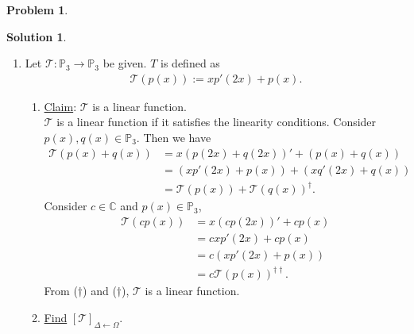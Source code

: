\documentclass{article}
\theoremstyle{definition}
\newtheorem*{prob*}{Problem}
\newtheorem*{sln*}{Solution}
\newcommand{\T}{\mathcal{T}}
\begin{document}
\begin{prob*}
\begin{sln*}
\begin{enumerate}
			
			
			
			\item Let $\T : \mathbb{P}_3 \to \mathbb{P}_3$ be given. $T$ is defined as
			\begin{align*}
			\T(p(x)) := xp'(2x) + p(x).
			\end{align*}
			\begin{enumerate}
				\item \underline{Claim}: $\T$ is a linear function.\\
				$\T$ is a linear function if it satisfies the linearity conditions. Consider $p(x), q(x) \in \mathbb{P}_3$. Then we have
				\begin{align*}
				\T(p(x) + q(x)) &= x(p(2x) + q(2x))' + (p(x) + q(x))\\
				&= (xp'(2x) + p(x))  + (xq'(2x) + q(x))\\ 
				&= \T(p(x)) + \T(q(x))^\dagger.
				\end{align*}
				Consider $c\in \mathbb{C}$ and $p(x)\in \mathbb{P}_3$,
				\begin{align*}
				\T(cp(x)) &= x(cp(2x))' + cp(x)\\
				&= cxp'(2x) + cp(x)\\ &= c(xp'(2x) + p(x))\\ &= c\T(p(x))^{\dagger\dagger}.
				\end{align*}
				From ($\dagger$) and ($\dagger$), $\T$ is a linear function. \\
				
				
				
				
				\item \underline{Find} $[\T]_{\Delta\leftarrow\Omega}$.\\
				

\end{enumerate}
\end{enumerate}
\end{sln*}
\end{prob*}
\end{document}
